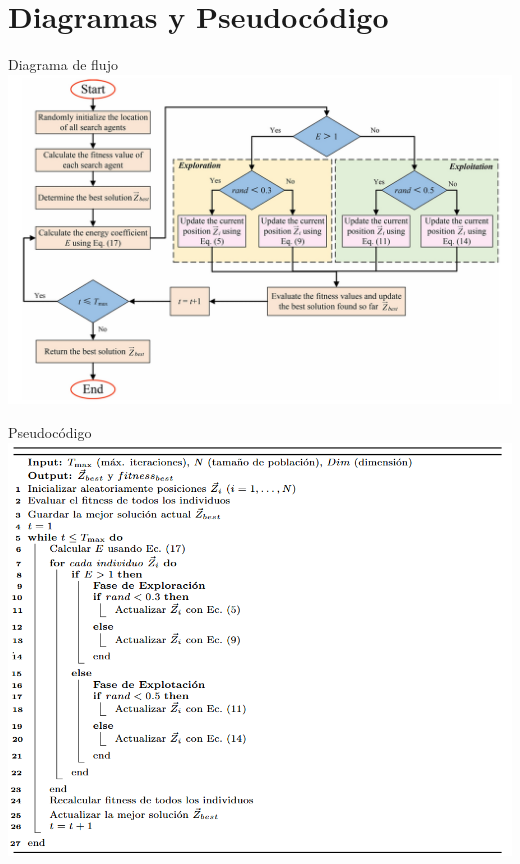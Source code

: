 \documentclass[12pt]{beamer}
\begin{document}
\section{Diagramas y Pseudocódigo}
\begin{frame}{Diagrama de flujo }
  \centering
            \includegraphics[width=0.9\linewidth]{DiagramaFlujo.png}
\end{frame}

\begin{frame}{Pseudocódigo }
  \centering
            \includegraphics[width=0.8\linewidth]{Pseudocódigo.png}
\end{frame}
\end{document}
